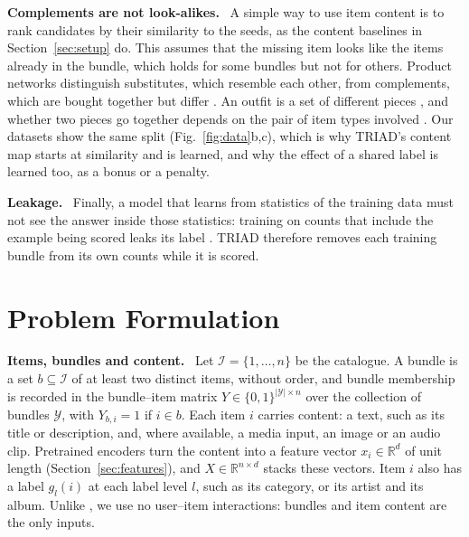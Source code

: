 \documentclass[runningheads]{llncs}
\newcommand{\R}{\mathbb{R}}
\renewcommand{\paragraph}[1]{\smallskip\noindent\textbf{#1}\ }
\begin{document}
\paragraph{Complements are not look-alikes.} A simple way to use item content is to rank candidates by their
similarity to the seeds, as the content baselines in Section~\ref{sec:setup} do. This assumes that the missing item
looks like the items already in the bundle, which holds for some bundles but not for others. Product networks
distinguish substitutes, which resemble each other, from complements, which are bought together but differ
\cite{mcauley}. An outfit is a set of different pieces \cite{han2017}, and whether two pieces go together depends on
the pair of item types involved \cite{vasileva2018}. Our datasets show the same split (Fig.~\ref{fig:data}b,c),
which is why TRIAD's content map starts at similarity and is learned, and why the effect of a shared label is
learned too, as a bonus or a penalty.

\paragraph{Leakage.} Finally, a model that learns from statistics of the training data must not see the answer
inside those statistics: training on counts that include the example being scored leaks its label
\cite{kapoor2023}. TRIAD therefore removes each training bundle from its own counts while it is scored.

\section{Problem Formulation}
\label{sec:problem}

\paragraph{Items, bundles and content.} Let $\mathcal{I}=\{1,\dots,n\}$ be the catalogue. A bundle is a set
$b\subseteq\mathcal{I}$ of at least two distinct items, without order, and bundle membership is recorded in the
bundle--item matrix $Y\in\{0,1\}^{|\mathcal{Y}|\times n}$ over the collection of bundles $\mathcal{Y}$, with
$Y_{b,i}=1$ if $i\in b$. Each item $i$ carries content: a text, such as its title or description, and, where
available, a media input, an image or an audio clip. Pretrained encoders turn the content into a feature vector
$x_i\in\R^{d}$ of unit length (Section~\ref{sec:features}), and $X\in\R^{n\times d}$ stacks these vectors. Item $i$ also
has a label $g_l(i)$ at each label level $l$, such as its category, or its artist and its album. Unlike
\cite{clhe,ramen}, we use no user--item interactions: bundles and item content are the only inputs.
\end{document}
